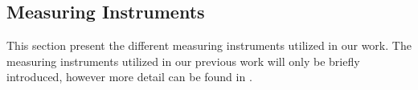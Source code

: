 \subsection{Measuring Instruments}\label{subsec:measuring_instruments}
This section present the different measuring instruments utilized in our work. The measuring instruments utilized in our previous work will only be briefly introduced, however more detail can be found in \cite{biksbois}.\newline %


